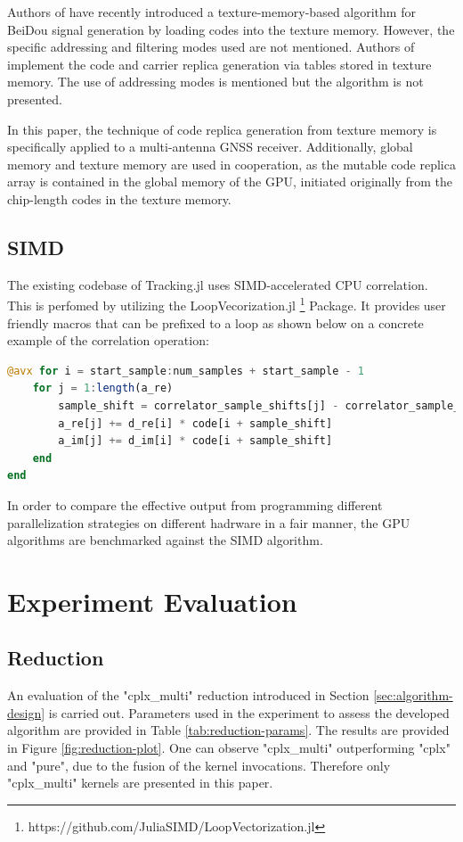 \documentclass{juliacon}
\begin{document}
Authors of \cite{Shi2021} have recently introduced a texture-memory-based algorithm for BeiDou signal generation by loading codes into the texture memory. However, the specific addressing and filtering modes used are not mentioned. Authors of \cite{Li2012} implement the code and carrier replica generation via tables stored in texture memory. The use of addressing modes is mentioned but the algorithm is not presented.

In this paper, the technique of code replica generation from texture memory is specifically applied to a multi-antenna GNSS receiver. Additionally, global memory and texture memory are used in cooperation, as the mutable code replica array is contained in the global memory of the GPU, initiated originally from the chip-length codes in the texture memory.

\subsection*{SIMD}
The existing codebase of Tracking.jl uses SIMD-accelerated CPU correlation. This is perfomed by utilizing the LoopVecorization.jl \footnote{https://github.com/JuliaSIMD/LoopVectorization.jl} Package. It provides user friendly macros that can be prefixed to a loop as shown below on a concrete example of the correlation operation:
\begin{lstlisting}[language = Julia]
@avx for i = start_sample:num_samples + start_sample - 1
    for j = 1:length(a_re)
        sample_shift = correlator_sample_shifts[j] - correlator_sample_shifts[1]
        a_re[j] += d_re[i] * code[i + sample_shift]
        a_im[j] += d_im[i] * code[i + sample_shift]
    end
end
\end{lstlisting}
In order to compare the effective output from programming different parallelization strategies on different hadrware in a fair manner, the GPU algorithms are benchmarked against the SIMD algorithm.

\section{Experiment Evaluation}\label{sec:analysis}

\subsection*{Reduction}
An evaluation of the "cplx\_multi" reduction introduced in Section \ref{sec:algorithm-design} is carried out. Parameters used in the experiment to assess the developed algorithm are provided in Table \ref{tab:reduction-params}. The results are provided in Figure \ref{fig:reduction-plot}. One can observe "cplx\_multi" outperforming "cplx" and "pure", due to the fusion of the kernel invocations. Therefore only "cplx\_multi" kernels are presented in this paper.
\end{document}
